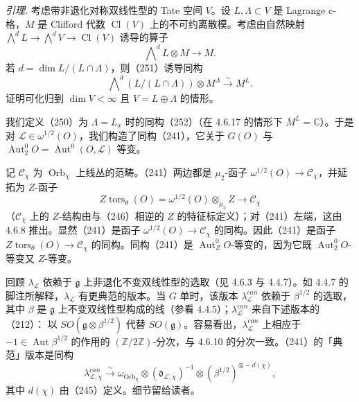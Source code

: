 
 \emph{引理.} 考虑带非退化对称双线性型的 Tate 空间 $V$。设 $L,\Lambda\subset V$ 是 Lagrange c-格，$M$ 是 Clifford 代数 $\operatorname{Cl}(V)$ 上的不可约离散模。考虑由自然映射 $\bigwedge^dL\to\bigwedge^dV\to\operatorname{Cl}(V)$ 诱导的算子
\begin{equation}\tag{251}
\bigwedge\nolimits^{d}L\otimes M\to M.
\end{equation}
若 $d=\dim L/(L\cap\Lambda)$，则（251）诱导同构
\begin{equation}\tag{252}
\bigwedge\nolimits^{d}(L/(L\cap\Lambda))\otimes M^{\Lambda}\xrightarrow{\ \sim\ }M^{L}.
\end{equation}
证明可化归到 $\dim V<\infty$ 且 $V=L\oplus\Lambda$ 的情形。

 我们定义（250）为 $\Lambda=L_x$ 时的同构（252）（在 4.6.17 的情形下 $M^L=\mathbb{C}$）。于是对 $\mathcal{L}\in\omega^{1/2}(O)$，我们构造了同构（241），它关于 $G(O)$ 与 $\operatorname{Aut}^0_2 O=\operatorname{Aut}^0(O,\mathcal{L})$ 等变。

记 $\mathcal{C}_\chi$ 为 $\operatorname{Orb}_\chi$ 上线丛的范畴。（241）两边都是 $\mu_2$-函子 $\omega^{1/2}(O)\to\mathcal{C}_\chi$，并延拓为 $Z$-函子
\[
Z\operatorname{tors}_\theta(O)=\omega^{1/2}(O)\otimes_{\mu_2}Z\to\mathcal{C}_\chi
\]
（$\mathcal{C}_\chi$ 上的 $Z$-结构由与（246）相逆的 $Z$ 的特征标定义）；对（241）左端，这由 4.6.8 推出。显然（241）是函子 $\omega^{1/2}(O)\to\mathcal{C}_\chi$ 的同构。因此（241）是函子 $Z\operatorname{tors}_\theta(O)\to\mathcal{C}_\chi$ 的同构。同构（241）是 $\operatorname{Aut}^0_Z O$-等变的，因为它既 $\operatorname{Aut}^0_2 O$-等变又 $Z$-等变。

 回顾 $\lambda_{\mathcal{L}}$ 依赖于 $\mathfrak{g}$ 上非退化不变双线性型的选取（见 4.6.3 与 4.4.7）。如 4.4.7 的脚注所解释，$\lambda_{\mathcal{L}}$ 有更典范的版本。当 $G$ 单时，该版本 $\lambda_{\mathcal{L}}^{can}$ 依赖于 $\beta^{1/2}$ 的选取，其中 $\beta$ 是 $\mathfrak{g}$ 上不变双线性型构成的线（参看 4.4.5）；$\lambda_{\mathcal{L}}^{can}$ 来自下述版本的（212）：%
以 $SO(\mathfrak{g}\otimes\beta^{1/2})$ 代替 $SO(\mathfrak{g})$。容易看出，$\lambda_{\mathcal{L}}^{can}$ 上相应于 $-1\in\operatorname{Aut}\beta^{1/2}$ 的作用的 $(\mathbb{Z}/2\mathbb{Z})$-分次，与 4.6.10 的分次一致。（241）的「典范」版本是同构
\begin{equation}\tag{253}
\lambda^{can}_{\mathcal{L},\chi}\xrightarrow{\ \sim\ }\omega_{\operatorname{Orb}_\chi}\otimes(\mathfrak{d}_{\mathcal{L},\chi})^{-1}\otimes(\beta^{1/2})^{\otimes-d(\chi)},
\end{equation}
其中 $d(\chi)$ 由（245）定义。细节留给读者。
